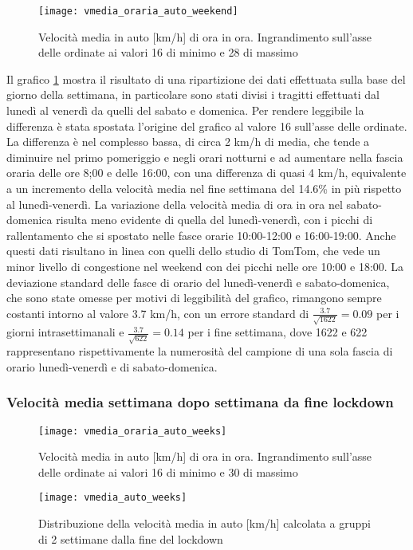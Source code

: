 \begin{figure}[H]
\texttt{[image: vmedia\_oraria\_auto\_weekend]}
\caption{Velocità media in auto [km/h] di ora in ora. Ingrandimento sull'asse delle ordinate ai valori 16 di minimo e 28 di massimo}
\label{image:4}
\end{figure}

Il grafico \ref{image:4} mostra il risultato di una ripartizione dei dati effettuata sulla base del giorno della settimana, in particolare sono stati divisi i tragitti effettuati dal lunedì al venerdì da quelli del sabato e domenica. Per rendere leggibile la differenza è stata spostata l'origine del grafico al valore 16 sull'asse delle ordinate. La differenza è nel complesso bassa, di circa 2 km/h di media, che tende a diminuire nel primo pomeriggio e negli orari notturni e ad aumentare nella fascia oraria delle ore 8;00 e delle 16:00, con una differenza di quasi 4 km/h, equivalente a un incremento della velocità media nel fine settimana del 14.6\% in più rispetto al lunedì-venerdì. La variazione della velocità media di ora in ora nel sabato-domenica risulta meno evidente di quella del lunedì-venerdì, con i picchi di rallentamento che si spostato nelle fasce orarie 10:00-12:00 e 16:00-19:00. Anche questi dati risultano in linea con quelli dello studio di TomTom, che vede un minor livello di congestione nel weekend con dei picchi nelle ore 10:00 e 18:00. La deviazione standard delle fasce di orario del lunedì-venerdì e sabato-domenica, che sono state omesse per motivi di leggibilità del grafico, rimangono sempre costanti intorno al valore 3.7 km/h, con un errore standard di $\frac{3.7}{\sqrt{1622}} = 0.09$ per i giorni intrasettimanali e $\frac{3.7}{\sqrt{622}} = 0.14$ per i fine settimana, dove 1622 e 622 rappresentano rispettivamente la numerosità del campione di una sola fascia di orario lunedì-venerdì e di sabato-domenica.

\subsubsection{Velocità media settimana dopo settimana da fine lockdown}

\begin{figure}[H]
\texttt{[image: vmedia\_oraria\_auto\_weeks]}
\caption{Velocità media in auto [km/h] di ora in ora. Ingrandimento sull'asse delle ordinate ai valori 16 di minimo e 30 di massimo}
\label{image:5}
\end{figure}

\begin{figure}[H]
	\texttt{[image: vmedia\_auto\_weeks]}
	\caption{Distribuzione della velocità media in auto [km/h] calcolata a gruppi di 2 settimane dalla fine del lockdown}
	\label{image:27}
\end{figure}

